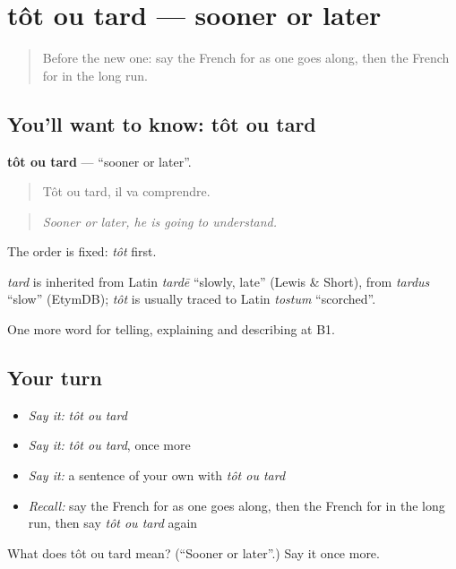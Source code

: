 \section[tôt ou tard]{tôt ou tard — sooner or later}

\label{lesson:FR-C271-tot-ou-tard}



\begin{quote}
Before the new one: say the French for as one goes along, then the French for in the long run.
\end{quote}

\subsection*{You'll want to know: tôt ou tard}
\textbf{tôt ou tard} — \textquotedblleft{}sooner or later\textquotedblright{}.

\begin{quote}
Tôt ou tard, il va comprendre.
\end{quote}

\begin{quote}
\emph{Sooner or later, he is going to understand.}
\end{quote}

The order is fixed: \emph{tôt} first.

\begin{cousinweb}
\emph{tard} is inherited from Latin \emph{tardē} \textquotedblleft{}slowly, late\textquotedblright{} (Lewis \& Short), from \emph{tardus} \textquotedblleft{}slow\textquotedblright{} (EtymDB); \emph{tôt} is usually traced to Latin \emph{tostum} \textquotedblleft{}scorched\textquotedblright{}.
\end{cousinweb}

\begin{grammarlens}[title={What you've built}]
One more word for telling, explaining and describing at B1.
\end{grammarlens}

\subsection*{Your turn}
\begin{itemize}
\raggedright
  \item \emph{Say it:} \emph{tôt ou tard}
  \item \emph{Say it:} \emph{tôt ou tard}, once more
  \item \emph{Say it:} a sentence of your own with \emph{tôt ou tard}
  \item \emph{Recall:} say the French for as one goes along, then the French for in the long run, then say \emph{tôt ou tard} again
\end{itemize}

\begin{tcolorbox}[breakable,colback=teal!4,colframe=teal!35!black,title={Before you move on}]
What does tôt ou tard mean? (\textquotedblleft{}Sooner or later\textquotedblright{}.) Say it once more.
\end{tcolorbox}
